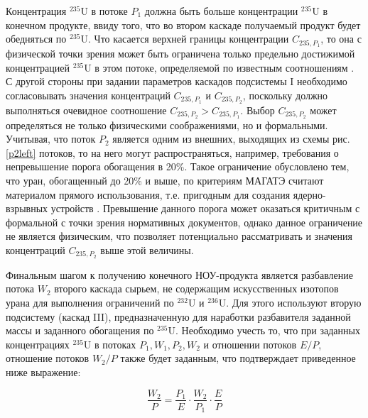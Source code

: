 \newpage

Концентрация $^{235}$U в потоке $P_1$ должна быть больше концентрации $^{235}$U в конечном продукте, ввиду того, что во втором каскаде получаемый продукт будет обедняться по $^{235}$U. Что касается верхней границы концентрации ${C}_{235,{P_1}}$, то она с физической точки зрения может быть ограничена только предельно достижимой концентрацией $^{235}$U в этом потоке, определяемой по известным соотношениям \cite{minenkoPredelnoeObogashcheniePromezhutochnyh1972,sulaberidzeOsobennostiObogashcheniyaKomponentov2006}. С другой стороны при задании параметров каскадов подсистемы I необходимо согласовывать значения концентраций ${C}_{235,{P_1}}$ и ${C}_{235,{P_2}}$, поскольку должно выполняться очевидное соотношение ${C}_{235,{P_2}}{>}{C}_{235,{P_1}}$.
Выбор $C_{235,{P_2}}$ может определяться не только физическими соображениями, но и формальными. Учитывая, что поток $P_2$ является одним из внешних, выходящих из схемы рис. \ref{p2left} потоков, то на него могут распространяться, например, требования о непревышение порога обогащения в 20\%. Такое ограничение обусловлено тем, что уран, обогащенный до 20\% и выше, по критериям МАГАТЭ считают материалом прямого использования, т.е. пригодным для создания ядерно-взрывных устройств \cite{brownOriginsSignificanceLimit2016,pshakinYadernoeNerasprostranenie2006}. Превышение данного порога может оказаться критичным с формальной с точки зрения нормативных документов, однако данное ограничение не является физическим, что позволяет потенциально рассматривать и значения концентраций  $C_{235,{P_2}}$ выше этой величины. 

Финальным шагом к получению конечного НОУ-продукта является разбавление потока $W_2$ второго каскада сырьем, не содержащим искусственных изотопов урана для выполнения ограничений по $^{232}$U и $^{236}$U.
Для этого используют вторую подсистему (каскад III), предназначенную для наработки разбавителя заданной массы и заданного обогащения по $^{235}$U.
Необходимо учесть то, что при заданных концентрациях $^{235}$U в потоках ${P_1}, {W_1}, {P_2}, {W_2}$ и отношении потоков $E/P$, отношение потоков ${W_2}{/P}$ также будет заданным, что подтверждает приведенное ниже выражение:

\begin{equation}
    \label{dc1}
    \frac{W_{2}}{P}=\frac{P_{1}}{E}\cdot\frac{W_{2}}{P_{1}}\cdot\frac{E}{P}
\end{equation}

